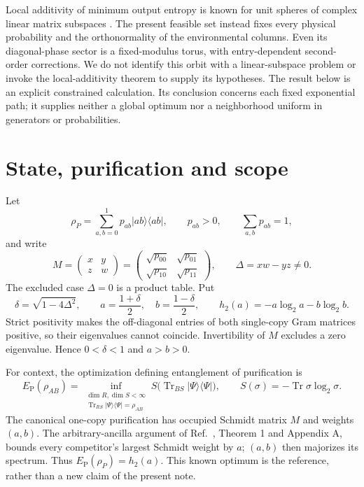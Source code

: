 \documentclass[11pt]{article}
\newcommand{\Tr}{\operatorname{Tr}}
\newcommand{\EP}{E_{\mathrm P}}
\newcommand{\ket}[1]{\lvert#1\rangle}
\newcommand{\bra}[1]{\langle#1\rvert}
\begin{document}
Local additivity of minimum output entropy is known for unit spheres of complex linear matrix subspaces \cite{Gour2011,Ruskai2023}. The present feasible set instead fixes every physical probability and the orthonormality of the environmental columns. Even its diagonal-phase sector is a fixed-modulus torus, with entry-dependent second-order corrections. We do not identify this orbit with a linear-subspace problem or invoke the local-additivity theorem to supply its hypotheses. The result below is an explicit constrained calculation. Its conclusion concerns each fixed exponential path; it supplies neither a global optimum nor a neighborhood uniform in generators or probabilities.

\section{State, purification and scope}
Let
\begin{equation}\label{eq:state}
 \rho_P=\sum_{a,b=0}^1 p_{ab}\ket{ab}\bra{ab},\qquad
 p_{ab}>0,\qquad \sum_{a,b}p_{ab}=1,
\end{equation}
and write
\begin{equation}\label{eq:M}
 M=\begin{pmatrix}x&y\\z&w\end{pmatrix}
   =\begin{pmatrix}\sqrt{p_{00}}&\sqrt{p_{01}}\\
                    \sqrt{p_{10}}&\sqrt{p_{11}}\end{pmatrix},
 \qquad \Delta=xw-yz\ne0.
\end{equation}
The excluded case $\Delta=0$ is a product table. Put
\begin{equation}\label{eq:ab}
 \delta=\sqrt{1-4\Delta^2},\qquad
 a=\frac{1+\delta}{2},\quad b=\frac{1-\delta}{2},\qquad
 h_2(a)=-a\log_2a-b\log_2b.
\end{equation}
Strict positivity makes the off-diagonal entries of both single-copy Gram matrices positive, so their eigenvalues cannot coincide. Invertibility of $M$ excludes a zero eigenvalue. Hence $0<\delta<1$ and $a>b>0$.

For context, the optimization defining entanglement of purification is
\begin{equation}\label{eq:EP}
 \EP(\rho_{AB})=
 \inf_{\substack{\dim R,\dim S<\infty\\
       \Tr_{RS}\ket{\Psi}\bra{\Psi}=\rho_{AB}}}
 S\bigl(\Tr_{BS}\ket{\Psi}\bra{\Psi}\bigr),
 \qquad S(\sigma)=-\Tr\sigma\log_2\sigma.
\end{equation}
The canonical one-copy purification has occupied Schmidt matrix $M$ and weights $(a,b)$. The arbitrary-ancilla argument of Ref.~\cite{Negari2026}, Theorem 1 and Appendix A, bounds every competitor's largest Schmidt weight by $a$; $(a,b)$ then majorizes its spectrum. Thus $\EP(\rho_P)=h_2(a)$. This known optimum is the reference, rather than a new claim of the present note.
\end{document}
